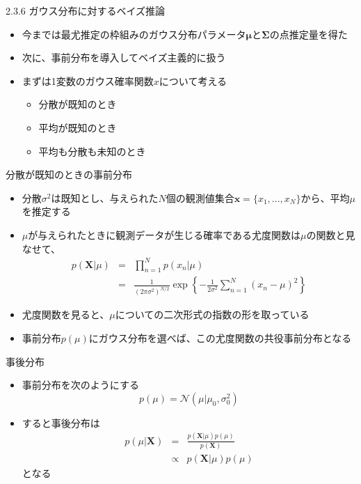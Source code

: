 \begin{frame}{2.3.6 ガウス分布に対するベイズ推論}
 \begin{itemize}
  \item 今までは最尤推定の枠組みのガウス分布パラメータ$\bm{\mu}$と$\bm{\Sigma}$の点推定量を得た
  \item 次に、事前分布を導入してベイズ主義的に扱う
  \item まずは1変数のガウス確率関数$x$について考える
        \begin{itemize}
         \item 分散が既知のとき
         \item 平均が既知のとき
         \item 平均も分散も未知のとき
        \end{itemize}
 \end{itemize}
\end{frame}

\begin{frame}{分散が既知のときの事前分布}
 \begin{itemize}
  \item \alert{分散$\sigma^2$は既知}とし、与えられた$N$個の観測値集合$\bm{x}=\{x_1,...,x_N\}$から、平均$\mu$を推定する
  \item $\mu$が与えられたときに観測データが生じる確率である尤度関数は$\mu$の関数と見なせて、
        \begin{eqnarray*}
         p(\bm{X}|\mu) &= &\prod_{n=1}^{N}p(x_n|\mu) \\
         &=& \frac{1}{(2\pi\sigma^2)^{N/2}}\exp\left\{-\frac{1}{2\sigma^2}\sum_{n=1}^{N}(x_n-\mu)^2\right\}
        \end{eqnarray*}
  \item 尤度関数を見ると、$\mu$についての二次形式の指数の形を取っている
  \item 事前分布$p(\mu)$にガウス分布を選べば、この尤度関数の共役事前分布となる
 \end{itemize}
\end{frame}

\begin{frame}{事後分布}
 \begin{itemize}
  \item 事前分布を次のようにする
        \begin{equation}
         p(\mu) = \mathcal{N}(\mu|\mu_0,\sigma_0^2)
        \end{equation}
  \item すると事後分布は
        \begin{eqnarray}
         p(\mu|\bm{X})&=&\frac{p(\bm{X}|\mu)p(\mu)}{p(\bm{X})} \nonumber \\
         &\propto &p(\bm{X}|\mu)p(\mu)
        \end{eqnarray}
        となる
 \end{itemize}
\end{frame}

